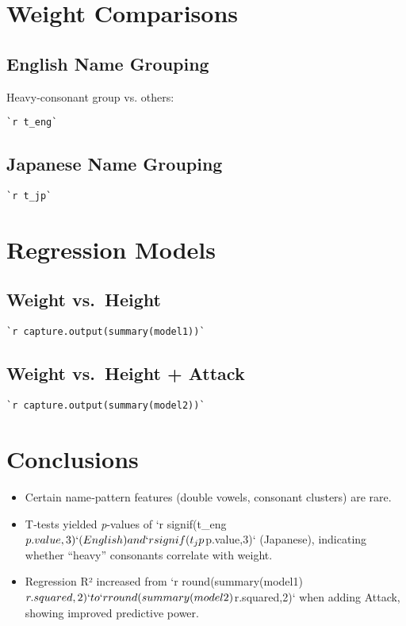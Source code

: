 \documentclass[11pt]{article}
\begin{document}
\section{Weight Comparisons}

\subsection{English Name Grouping}
Heavy‐consonant group vs. others:
\begin{verbatim}
`r t_eng`
\end{verbatim}

\subsection{Japanese Name Grouping}
\begin{verbatim}
`r t_jp`
\end{verbatim}

\section{Regression Models}

\subsection{Weight vs.\ Height}
\begin{verbatim}
`r capture.output(summary(model1))`
\end{verbatim}

\subsection{Weight vs.\ Height + Attack}
\begin{verbatim}
`r capture.output(summary(model2))`
\end{verbatim}

\section{Conclusions}
\begin{itemize}
  \item Certain name‐pattern features (double vowels, consonant clusters) are rare.  
  \item T‐tests yielded \textit{p}-values of `r signif(t_eng$p.value,3)` (English) and `r signif(t_jp$p.value,3)` (Japanese), indicating whether “heavy” consonants correlate with weight.  
  \item Regression R² increased from `r round(summary(model1)$r.squared,2)` to `r round(summary(model2)$r.squared,2)` when adding Attack, showing improved predictive power.
\end{itemize}
\end{document}
